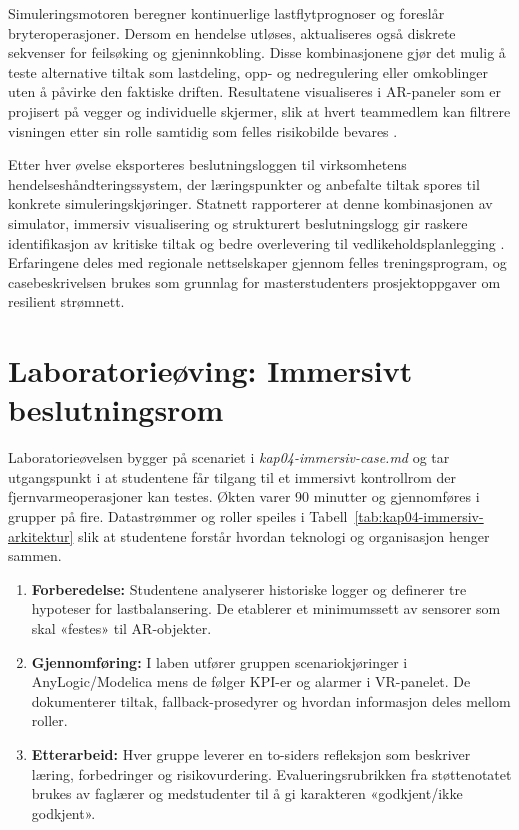 Simuleringsmotoren beregner kontinuerlige lastflytprognoser og foreslår bryteroperasjoner. Dersom en hendelse utløses, aktualiseres også diskrete sekvenser for feilsøking og gjeninnkobling. Disse kombinasjonene gjør det mulig å teste alternative tiltak som lastdeling, opp- og nedregulering eller omkoblinger uten å påvirke den faktiske driften. Resultatene visualiseres i AR-paneler som er projisert på vegger og individuelle skjermer, slik at hvert teammedlem kan filtrere visningen etter sin rolle samtidig som felles risikobilde bevares \citep{kongsberg2023kognitwin}.

Etter hver øvelse eksporteres beslutningsloggen til virksomhetens hendelseshåndteringssystem, der læringspunkter og anbefalte tiltak spores til konkrete simuleringskjøringer. Statnett rapporterer at denne kombinasjonen av simulator, immersiv visualisering og strukturert beslutningslogg gir raskere identifikasjon av kritiske tiltak og bedre overlevering til vedlikeholdsplanlegging \citep{statnett2024kontrolltarn}. Erfaringene deles med regionale nettselskaper gjennom felles treningsprogram, og casebeskrivelsen brukes som grunnlag for masterstudenters prosjektoppgaver om resilient strømnett.

\section{Laboratorieøving: Immersivt beslutningsrom}
Laboratorieøvelsen bygger på scenariet i \textit{kap04-immersiv-case.md} og tar utgangspunkt i at studentene får tilgang til et immersivt kontrollrom der fjernvarmeoperasjoner kan testes. Økten varer 90 minutter og gjennomføres i grupper på fire. Datastrømmer og roller speiles i Tabell~\ref{tab:kap04-immersiv-arkitektur} slik at studentene forstår hvordan teknologi og organisasjon henger sammen.

\begin{enumerate}
    \item \textbf{Forberedelse:} Studentene analyserer historiske logger og definerer tre hypoteser for lastbalansering. De etablerer et minimumssett av sensorer som skal «festes» til AR-objekter.
    \item \textbf{Gjennomføring:} I laben utfører gruppen scenariokjøringer i AnyLogic/Modelica mens de følger KPI-er og alarmer i VR-panelet. De dokumenterer tiltak, fallback-prosedyrer og hvordan informasjon deles mellom roller.
    \item \textbf{Etterarbeid:} Hver gruppe leverer en to-siders refleksjon som beskriver læring, forbedringer og risikovurdering. Evalueringsrubrikken fra støttenotatet brukes av faglærer og medstudenter til å gi karakteren «godkjent/ikke godkjent».
\end{enumerate}

